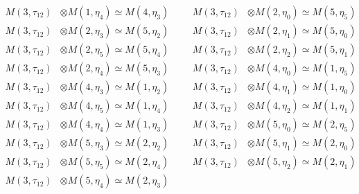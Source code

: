 \begin{align*}
M(3,\tau_{12}) &\otimes M(1,\eta_{4}) \simeq M(4,\eta_{3}) &&& M(3,\tau_{12}) &\otimes M(2,\eta_{0}) \simeq M(5,\eta_{5})\\
M(3,\tau_{12}) &\otimes M(2,\eta_{3}) \simeq M(5,\eta_{2}) &&& M(3,\tau_{12}) &\otimes M(2,\eta_{1}) \simeq M(5,\eta_{0})\\
M(3,\tau_{12}) &\otimes M(2,\eta_{5}) \simeq M(5,\eta_{4}) &&& M(3,\tau_{12}) &\otimes M(2,\eta_{2}) \simeq M(5,\eta_{1})\\
M(3,\tau_{12}) &\otimes M(2,\eta_{4}) \simeq M(5,\eta_{3}) &&& M(3,\tau_{12}) &\otimes M(4,\eta_{0}) \simeq M(1,\eta_{5})\\
M(3,\tau_{12}) &\otimes M(4,\eta_{3}) \simeq M(1,\eta_{2}) &&& M(3,\tau_{12}) &\otimes M(4,\eta_{1}) \simeq M(1,\eta_{0})\\
M(3,\tau_{12}) &\otimes M(4,\eta_{5}) \simeq M(1,\eta_{4}) &&& M(3,\tau_{12}) &\otimes M(4,\eta_{2}) \simeq M(1,\eta_{1})\\
M(3,\tau_{12}) &\otimes M(4,\eta_{4}) \simeq M(1,\eta_{3}) &&& M(3,\tau_{12}) &\otimes M(5,\eta_{0}) \simeq M(2,\eta_{5})\\
M(3,\tau_{12}) &\otimes M(5,\eta_{3}) \simeq M(2,\eta_{2}) &&& M(3,\tau_{12}) &\otimes M(5,\eta_{1}) \simeq M(2,\eta_{0})\\
M(3,\tau_{12}) &\otimes M(5,\eta_{5}) \simeq M(2,\eta_{4}) &&& M(3,\tau_{12}) &\otimes M(5,\eta_{2}) \simeq M(2,\eta_{1})\\
M(3,\tau_{12}) &\otimes M(5,\eta_{4}) \simeq M(2,\eta_{3})
\end{align*}

